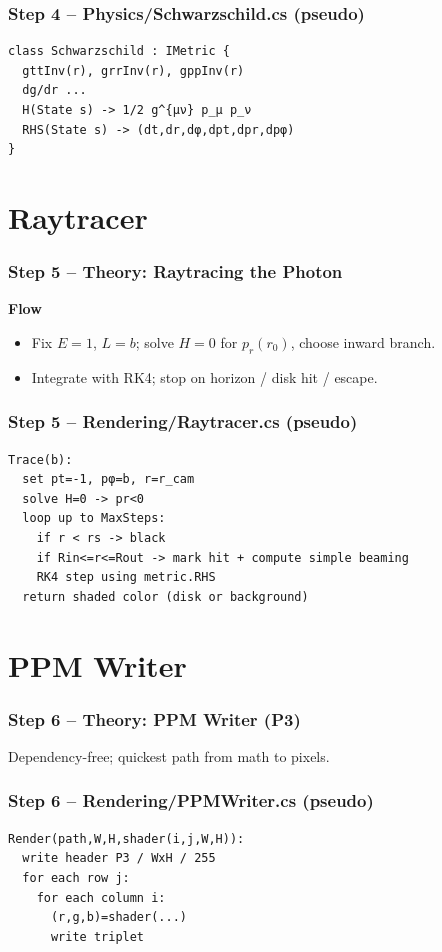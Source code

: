 \documentclass[aspectratio=169]{beamer}
\newcommand{\ProgressStep}[1]{\progressstep{#1}}
\newcommand{\ThisFrameTitle}[1]{\frametitle{#1}}
\begin{document}
\begin{frame}[fragile]
  \ProgressStep{4}\ThisFrameTitle{Step 4 -- Physics/Schwarzschild.cs (pseudo)}
\begin{verbatim}
class Schwarzschild : IMetric {
  gttInv(r), grrInv(r), gppInv(r)
  dg/dr ...
  H(State s) -> 1/2 g^{μν} p_μ p_ν
  RHS(State s) -> (dt,dr,dφ,dpt,dpr,dpφ)
}
\end{verbatim}
\end{frame}

\section{Raytracer}
\begin{frame}
  \ProgressStep{5}\ThisFrameTitle{Step 5 -- Theory: Raytracing the Photon}
  \textbf{Flow}
  \begin{itemize}
    \item Fix $E=1$, $L=b$; solve $H=0$ for $p_r(r_0)$, choose inward branch.
    \item Integrate with RK4; stop on horizon / disk hit / escape.
  \end{itemize}
\end{frame}

\begin{frame}[fragile]
  \ProgressStep{5}\ThisFrameTitle{Step 5 -- Rendering/Raytracer.cs (pseudo)}
\begin{verbatim}
Trace(b):
  set pt=-1, pφ=b, r=r_cam
  solve H=0 -> pr<0
  loop up to MaxSteps:
    if r < rs -> black
    if Rin<=r<=Rout -> mark hit + compute simple beaming
    RK4 step using metric.RHS
  return shaded color (disk or background)
\end{verbatim}
\end{frame}

\section{PPM Writer}
\begin{frame}
  \ProgressStep{6}\ThisFrameTitle{Step 6 -- Theory: PPM Writer (P3)}
  Dependency-free; quickest path from math to pixels.
\end{frame}

\begin{frame}[fragile]
  \ProgressStep{6}\ThisFrameTitle{Step 6 -- Rendering/PPMWriter.cs (pseudo)}
\begin{verbatim}
Render(path,W,H,shader(i,j,W,H)):
  write header P3 / WxH / 255
  for each row j:
    for each column i:
      (r,g,b)=shader(...)
      write triplet
\end{verbatim}
\end{frame}
\end{document}
